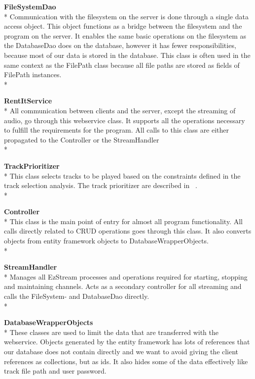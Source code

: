 \documentclass[a4paper,11pt,report]{article}
\begin{document}
\textbf{FileSystemDao} \\*
Communication with the filesystem on the server is done through a single data access object. This object functions as a bridge between the filesystem and the program on the server. It enables the same basic operations on the filesystem as the DatabaseDao does on the database, however it has fewer responsibilities, because most of our data is stored in the database. This class is often used in the same context as the FilePath class because all file paths are stored as fields of FilePath instances. \\*

\textbf{RentItService} \\*
All communication between clients and the server, except the streaming of audio, go through this webservice class. It supports all the operations necessary to fulfill the requirements for the program. All calls to this class are either propagated to the Controller or the StreamHandler \\*

\textbf{TrackPrioritizer} \\*
This class selects tracks to be played based on the constraints defined in the track selection analysis. The track prioritizer are described in ~. \\*

\textbf{Controller} \\*
This class is the main point of entry for almost all program functionality. All calls directly related to CRUD operations goes through this class. It also converts objects from entity framework objects to DatabaseWrapperObjects.\\*

\textbf{StreamHandler} \\*
Manages all EzStream processes and operations required for starting, stopping and maintaining channels. Acts as a secondary controller for all streaming and calls the FileSystem- and DatabaseDao directly. \\*

\textbf{DatabaseWrapperObjects} \\*
These classes are used to limit the data that are transferred with the webservice. Objects generated by the entity framework has lots of references that our database does not contain directly and we want to avoid giving the client references as collections, but as ids. It also hides some of the data effectively like track file path and user password.
\end{document}
